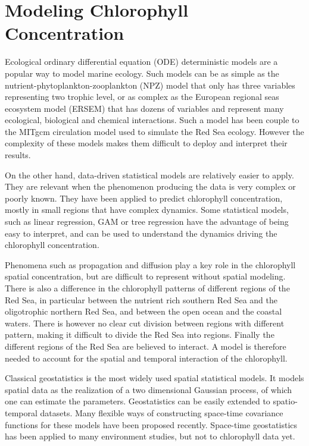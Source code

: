 \section{Modeling Chlorophyll Concentration}

Ecological ordinary differential equation (ODE) deterministic models are a popular way to model marine ecology. Such models can be as simple as the nutrient-phytoplankton-zooplankton (NPZ) model that only has three variables representing two trophic level, or as complex as the European regional seas ecosystem model (ERSEM) that has dozens of variables and represent many ecological, biological and chemical interactions. Such a model has been couple to the MITgcm circulation model used to simulate the Red Sea ecology. However the complexity of these models makes them difficult to deploy and interpret their results. 

On the other hand, data-driven statistical models are relatively easier to apply. They are relevant when the phenomenon producing the data is very complex or poorly known. They have been applied to predict chlorophyll concentration, mostly in small regions that have complex dynamics. Some statistical models, such as linear regression, GAM or tree regression have the advantage of being easy to interpret, and can be used to understand the dynamics driving the chlorophyll concentration.

Phenomena such as propagation and diffusion play a key role in the chlorophyll spatial concentration, but are difficult to represent without spatial modeling. There is also a difference in the chlorophyll patterns of different regions of the Red Sea, in particular between the nutrient rich southern Red Sea and the oligotrophic northern Red Sea, and between the open ocean and the coastal waters. There is however no clear cut division between regions with different pattern, making it difficult to divide the Red Sea into regions. Finally the different regions of the Red Sea are believed to interact. A model is therefore needed to account for the spatial and temporal interaction of the chlorophyll.

Classical geostatistics is the most widely used spatial statistical models. It models spatial data as the realization of a two dimensional Gaussian process, of which one can estimate the parameters. Geostatistics can be easily extended to spatio-temporal datasets. Many flexible ways of constructing space-time covariance functions for these models have been proposed recently. Space-time geostatistics has been applied to many environment studies, but not to chlorophyll data yet.

